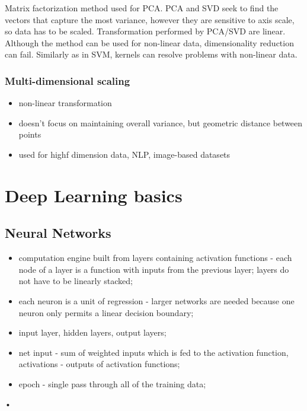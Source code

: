 \documentclass[11pt]{book}
\begin{document}
Matrix factorization method used for PCA. PCA and SVD seek to find the vectors that capture the most variance, however they are sensitive to axis scale, so data has to be scaled. Transformation performed by PCA/SVD are linear. Although the method can be used for non-linear data, dimensionality reduction can fail. Similarly as in SVM, kernels can resolve problems with non-linear data.

\subsection{Multi-dimensional scaling}

\begin{itemize}
    \item non-linear transformation
    \item doesn't focus on maintaining overall variance, but geometric distance between points
    \item used for highf dimension data, NLP, image-based datasets
\end{itemize}

\chapter{Deep Learning basics}

\section{Neural Networks}

\begin{itemize}

\item computation engine built from layers containing activation functions - each node of a layer is a function with inputs from the previous layer; layers do not have to be linearly stacked;

\item each neuron is a unit of regression - larger networks are needed because one neuron only permits a linear decision boundary;

\item input layer, hidden layers, output layers;

\item net input - sum of weighted inputs which is fed to the activation function, activations - outputs of activation functions;

\item epoch - single pass through all of the training data;

\end{itemize}•
\end{document}
